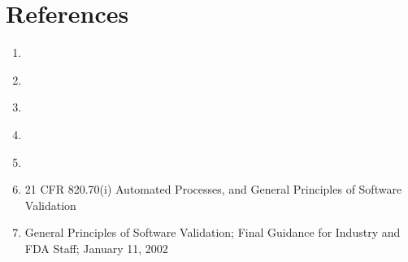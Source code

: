 \section{References}
\begin{enumerate}
  \item \sopSDLC\
  \item \sopSCM\
  \item \sopGDP\
  \item \sopPAP\
  \item \sopISS\

  \item 21 CFR 820.70(i) Automated Processes, and General Principles of Software
    Validation

  \item General Principles of Software Validation; Final Guidance for Industry
    and FDA Staff; January 11, 2002
\end{enumerate}
